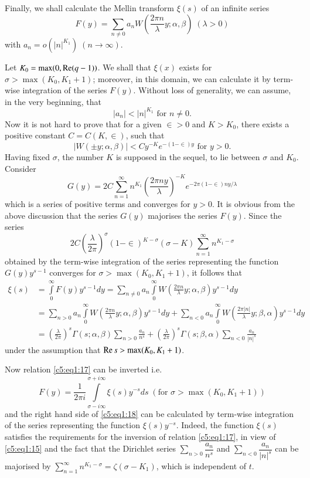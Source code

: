 Finally, we shall calculate the Mellin transform $\xi(s)$ of an
infinite series
\begin{equation*}
F(y) = \sum_{n\neq 0} a_nW(\frac{2\pi n}{\lambda} y;\alpha,\beta) \; 
(\lambda >0) \tag{16}\label{c5:eq1:16}
\end{equation*}
with $a_n=o(|n|^{K_1})\;  (n\to \infty)$.

Let $K_0=\max(0,\operatorname{Re}(q-1))$. We shall that $\xi(x)$ exists for
$\sigma>\max(K_0, K_1+1)$; moreover, in this domain, we can calculate
it by term-wise integration of the series $F(y)$. Without loss of
generality, we can assume, in the very beginning, that 
$$
|a_n| < |n|^{K_1} \text{ for } n \neq 0.
$$
Now \pageoriginale it is not hard to prove that for a given
$\in > 0$ and $K>K_0$, there exists a positive constant
$C=C(K,\in)$, such that
$$
|W(\pm y ; \alpha,\beta)|< Cy^{-K} e^{-(1-\in)y} \text{ for }
y>0. 
$$
Having fixed $\sigma$, the number $K$ is supposed in the sequel, to
lie between $\sigma$ and $K_0$. Consider
$$
G(y) = 2C\sum^{\infty}_{n=1} n^{K_1} (\frac{2\pi ny}{\lambda})^{-K}
e^{-2\pi(1-\in) ny/\lambda} 
$$
which is a series of positive terms and converges for $y>0$. It is
obvious from the above discussion that the series $G(y)$ majorises the
series $F(y)$. Since the series 
$$
2C(\frac{\lambda}{2\pi})^{\sigma} (1-\in)^{K-\sigma}
(\sigma-K) \sum^{\infty}_{n=1} n^{K_1-\sigma}
$$
obtained by the term-wise integration of the series representing the
function $G(y) y^{s-1}$ converges for $\sigma > \max (K_0, K_1 +1)$,
it follows that 
\begin{align*}
\xi(s) & = \int\limits^{\infty}_0 F(y) y^{s-1} dy = \sum_{n\neq 0} a_n
\int\limits^{\infty}_0 W(\frac{2\pi n}{\lambda} y;\alpha,\beta)
y^{s-1} dy\\
& = \sum_{n>0} a_n \int\limits^{\infty}_0 W(\frac{2\pi n}{\lambda}
y;\alpha,\beta) y^{s-1} dy + \sum_{n<0} a_n \int\limits^{\infty}_0
W(\frac{2\pi |n|}{\lambda} y;\beta,\alpha)y^{s-1} dy\\
& = (\frac{\lambda}{2\pi})^s \Gamma(s;\alpha,\beta) \sum_{n>0}
\frac{a_n}{n^s} + (\frac{\lambda}{2\pi})^s \Gamma(s;\beta,\alpha)
\sum_{n<0} \frac{a_n}{|n|^s} \tag{17}\label{c5:eq1:17}
\end{align*}
under the assumption that $\operatorname{Re} s>\max (K_0,K_1+1)$.

Now relation \eqref{c5:eq1:17} can be inverted i.e.
\begin{equation*}
F(y) =\frac{1}{2\pi i} \int\limits^{\sigma+i\infty}_{\sigma-i\infty}
\xi(s)y^{-s} ds \; (\text{for } \sigma > 
\max (K_0, K_1 +1)) \tag{18}\label{c5:eq1:18}
\end{equation*}
and the right hand side of \eqref{c5:eq1:18} can be calculated by term-wise
integration of the series representing the function
$\xi(s)y^{-s}$. Indeed, the function $\xi(s)$ satisfies the
requirements for the inversion of relation \eqref{c5:eq1:17}, 
in view of \eqref{c5:eq1:15}
\pageoriginale and the fact that the Dirichlet series 
$\sum_{n>0}\dfrac{a_n}{n^s}$ and $\sum_{n<0}\dfrac{a_n}{|n|^s}$ can be
majorised by $\sum^{\infty}_{n=1} n^{K_1-\sigma}=\zeta (\sigma-K_1)$,
which is independent of $t$.

